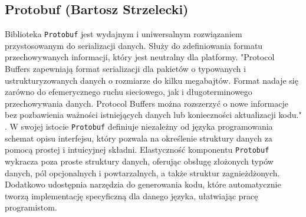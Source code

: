 \subsection{Protobuf (Bartosz Strzelecki)}\label{ss:protobuf}

Biblioteka \texttt{Protobuf} jest wydajnym i uniwersalnym rozwiązaniem przystosowanym do serializacji
danych. Służy do zdefiniowania formatu przechowywanych informacji, który jest neutralny dla platformy.
"Protocol Buffers zapewniają format serializacji dla pakietów o typowanych i ustrukturyzowanych danych o rozmiarze do
kilku megabajtów. Format nadaje się zarówno do efemerycznego ruchu sieciowego, jak i długoterminowego przechowywania
danych. Protocol Buffers można rozszerzyć o nowe informacje bez pozbawienia ważności istniejących danych lub
konieczności aktualizacji kodu." \cite{protobuf}.
W swojej istocie \texttt{Protobuf} definiuje niezależny od języka programowania schemat opisu interfejsu,
który pozwala na określenie struktury danych za pomocą prostej i intuicyjnej składni.
Elastyczność komponentu \texttt{Protobuf} wykracza poza proste struktury danych, oferując obsługę złożonych typów danych,
pól opcjonalnych i powtarzalnych,
a także struktur zagnieżdżonych. Dodatkowo udostępnia narzędzia do generowania kodu,
które automatycznie tworzą implementację specyficzną dla danego języka, ułatwiając pracę programistom.
